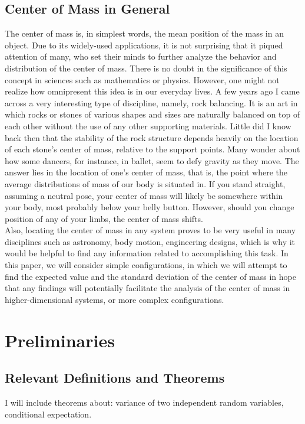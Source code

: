 \documentclass[11pt, twoside, reqno]{book}
\begin{document}
\section{Center of Mass in General}
\label{sec1}
The center of mass is, in simplest words, the mean position of the mass in an object. Due to its widely-used applications, it is not surprising that it piqued attention of many, who set their minds to further analyze the behavior and distribution of the center of mass. There is no doubt in the significance of this concept in sciences such as mathematics or physics. However, one might not realize how omnipresent this idea is in our everyday lives. A few years ago I came across a very interesting type of discipline, namely, rock balancing. It is an art in which rocks or stones of various shapes and sizes are naturally balanced on top of each other without the use of any other supporting materials. Little did I know back then that the stability of the rock structure depends heavily on the location of each stone's center of mass, relative to the support points. Many wonder about how some dancers, for instance, in ballet, seem to defy gravity as they move. The answer lies in the location of one's center of mass, that is, the point where the average distributions of mass of our body is situated in. If you stand straight, assuming a neutral pose, your center of mass will likely be somewhere within your body, most probably below your belly button. However, should you change position of any of your limbs, the center of mass shifts. \\
Also, locating the center of mass in any system proves to be very useful in many disciplines such as astronomy, body motion, engineering designs, which is why it would be helpful to find any information related to accomplishing this task. In this paper, we will consider simple configurations, in which we will attempt to find the expected value and the standard deviation of the center of mass in hope that any findings will potentially facilitate the analysis of the center of mass in higher-dimensional systems, or more complex configurations.

\chapter{Preliminaries}
\label{Chap0}

\section{Relevant Definitions and Theorems}
\label{sec1}
I will include theorems about: variance of two independent random variables, conditional expectation.
\end{document}
